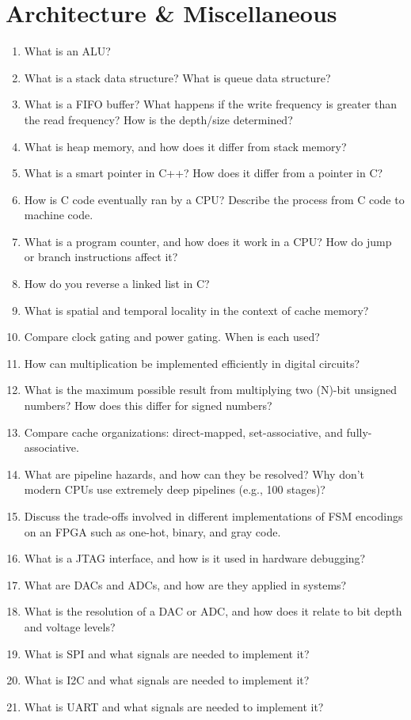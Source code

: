\documentclass[11pt]{article}
\begin{document}
\section{Architecture \& Miscellaneous}
\begin{enumerate}
    \item What is an ALU?
    \item What is a stack data structure? What is queue data structure?
    \item What is a FIFO buffer? What happens if the write frequency is greater
    than the read frequency? How is the depth/size determined?
    \item What is heap memory, and how does it differ from stack memory?
    \item What is a smart pointer in C++? How does it differ from a pointer in
    C?
    \item How is C code eventually ran by a CPU? Describe the process from C
    code to machine code.
    \item What is a program counter, and how does it work in a CPU? How do jump
    or branch instructions affect it?
    \item How do you reverse a linked list in C?
    \item What is spatial and temporal locality in the context of cache memory?
    \item Compare clock gating and power gating. When is each used?
    \item How can multiplication be implemented efficiently in digital
    circuits?
    \item What is the maximum possible result from multiplying two (N)-bit
    unsigned numbers? How does this differ for signed numbers?
    \item Compare cache organizations: direct-mapped, set-associative, and
    fully-associative.
    \item What are pipeline hazards, and how can they be resolved? Why don't
    modern CPUs use extremely deep pipelines (e.g., 100 stages)?
    \item Discuss the trade-offs involved in different implementations of FSM
    encodings on an FPGA such as one-hot, binary, and gray code.
    \item What is a JTAG interface, and how is it used in hardware debugging?
    \item What are DACs and ADCs, and how are they applied in systems?
    \item What is the resolution of a DAC or ADC, and how does it relate to
    bit depth and voltage levels?
    \item What is SPI and what signals are needed to implement it?
    \item What is I2C and what signals are needed to implement it?
    \item What is UART and what signals are needed to implement it?
\end{enumerate}
\end{document}
